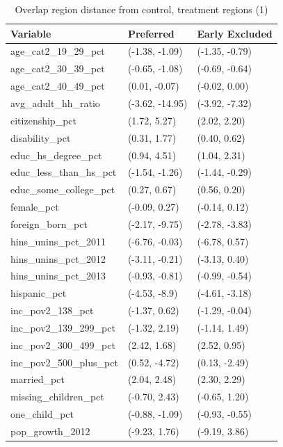 \documentclass{article}
\begin{document}
\begin{appendix}
\begin{table}[ht]
\centering
    \caption{Overlap region distance from control, treatment regions (1)}
    \label{tab:oatedist1}
\begin{tabular}{lll}
  \hline
Variable & Preferred & Early Excluded \\ 
  \hline
age\_cat2\_19\_29\_pct & (-1.38, -1.09) & (-1.35, -0.79) \\ 
  age\_cat2\_30\_39\_pct & (-0.65, -1.08) & (-0.69, -0.64) \\ 
  age\_cat2\_40\_49\_pct & (0.01, -0.07) & (-0.02, 0.00) \\ 
  avg\_adult\_hh\_ratio & (-3.62, -14.95) & (-3.92, -7.32) \\ 
  citizenship\_pct & (1.72, 5.27) & (2.02, 2.20) \\ 
  disability\_pct & (0.31, 1.77) & (0.40, 0.62) \\ 
  educ\_hs\_degree\_pct & (0.94, 4.51) & (1.04, 2.31) \\ 
  educ\_less\_than\_hs\_pct & (-1.54, -1.26) & (-1.44, -0.29) \\ 
  educ\_some\_college\_pct & (0.27, 0.67) & (0.56, 0.20) \\ 
  female\_pct & (-0.09, 0.27) & (-0.14, 0.12) \\ 
  foreign\_born\_pct & (-2.17, -9.75) & (-2.78, -3.83) \\ 
  hins\_unins\_pct\_2011 & (-6.76, -0.03) & (-6.78, 0.57) \\ 
  hins\_unins\_pct\_2012 & (-3.11, -0.21) & (-3.13, 0.40) \\ 
  hins\_unins\_pct\_2013 & (-0.93, -0.81) & (-0.99, -0.54) \\ 
  hispanic\_pct & (-4.53, -8.9) & (-4.61, -3.18) \\ 
  inc\_pov2\_138\_pct & (-1.37, 0.62) & (-1.29, -0.04) \\ 
  inc\_pov2\_139\_299\_pct & (-1.32, 2.19) & (-1.14, 1.49) \\ 
  inc\_pov2\_300\_499\_pct & (2.42, 1.68) & (2.52, 0.95) \\ 
  inc\_pov2\_500\_plus\_pct & (0.52, -4.72) & (0.13, -2.49) \\ 
  married\_pct & (2.04, 2.48) & (2.30, 2.29) \\ 
  missing\_children\_pct & (-0.70, 2.43) & (-0.65, 1.20) \\ 
  one\_child\_pct & (-0.88, -1.09) & (-0.93, -0.55) \\ 
  pop\_growth\_2012 & (-9.23, 1.76) & (-9.19, 3.86) \\ 

\end{tabular}
\end{table}
\end{appendix}
\end{document}
